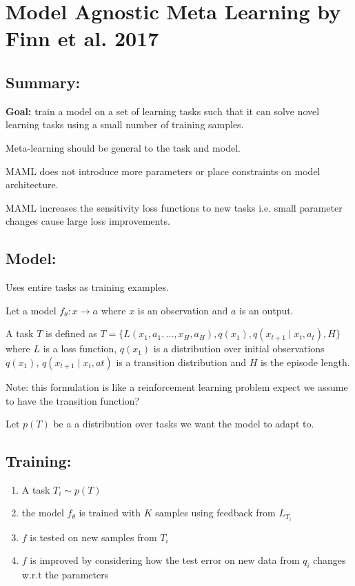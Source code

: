 \section{Model Agnostic Meta Learning by Finn et al. 2017}

\subsection{Summary:}

\textbf{Goal:} train a model on a set of learning tasks such that it can solve
novel learning tasks using a small number of training samples.

Meta-learning should be general to the task and model.

MAML does not introduce more parameters or place constraints on model architecture.

MAML increases the sensitivity loss functions to new tasks i.e. small parameter changes cause large loss improvements.

\subsection{Model:}

Uses entire tasks as training examples. 

Let a model $f_\theta: x \rightarrow a$ where $x$ is an observation and $a$ is an output. 

A task $T$ is defined as $T = \{ L(x_1, a_1, \dots, x_H, a_H), q(x_1), q(x_{t+1} \mid x_t, a_t), H \}$
where $L$ is a loss function, $q(x_1)$ is a distribution over initial observations $q(x_1)$,
$q(x_{t+1} \mid x_t, at)$ is a transition distribution and $H$ is the episode length.

Note: this formulation is like a reinforcement learning problem expect we assume to have the transition function?

Let $p(T)$ be a a distribution over tasks we want the model to adapt to.

\subsection{Training:}

\begin{enumerate}
\item A task $T_i \sim p(T)$
\item the model $f_\theta$ is trained with $K$ samples using feedback from $L_{T_i}$
\item $f$ is tested on new samples from $T_i$
\item $f$ is improved by considering how the test error on new data from $q_i$ changes w.r.t the parameters
\end{enumerate}

